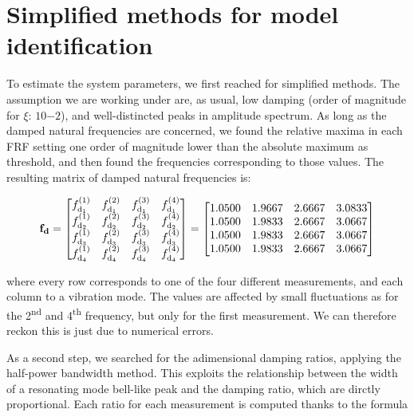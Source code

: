\documentclass[a4paper,12pt,oneside]{article}
\begin{document}
\section{Simplified methods for model identification}

To estimate the system parameters, we first reached for simplified methods. The assumption we are working under are, as usual, low damping (order of magnitude for $ \xi $: $ 10{-2} $), and well-distincted peaks in amplitude spectrum. As long as the damped natural frequencies are concerned, we found the relative maxima in each FRF setting one order of magnitude lower than the absolute maximum as threshold, and then found the frequencies corresponding to those values. The resulting matrix of damped natural frequencies is:

\[
	\mathbf{f_d} =	\begin{bmatrix}
										f_{\textup{d}_1}^{(1)}	& f_{\textup{d}_1}^{(2)} & %
											f_{\textup{d}_1}^{(3)}	& f_{\textup{d}_1}^{(4)} \\
										f_{\textup{d}_2}^{(1)}	& f_{\textup{d}_2}^{(2)} & %
											f_{\textup{d}_2}^{(3)}	& f_{\textup{d}_2}^{(4)} \\
										f_{\textup{d}_3}^{(1)}	& f_{\textup{d}_3}^{(2)} & %
											f_{\textup{d}_3}^{(3)}	& f_{\textup{d}_3}^{(4)} \\
										f_{\textup{d}_4}^{(1)}	& f_{\textup{d}_4}^{(2)} & %
											f_{\textup{d}_4}^{(3)}	& f_{\textup{d}_4}^{(4)} \\
									\end{bmatrix} = \begin{bmatrix}
																		1.0500	& 1.9667	& 2.6667	& 3.0833 \\
																		1.0500	& 1.9833	& 2.6667	& 3.0667 \\
																		1.0500	& 1.9833	& 2.6667	& 3.0667 \\
																		1.0500	& 1.9833	& 2.6667	& 3.0667
																	\end{bmatrix}
\]

where every row corresponds to one of the four different measurements, and each column to a vibration mode. The values are affected by small fluctuations as for the 2\textsuperscript{nd} and 4\textsuperscript{th} frequency, but only for the first measurement. We can therefore reckon this is just due to numerical errors.

As a second step, we searched for the adimensional damping ratios, applying the half-power bandwidth method. This exploits the relationship between the width of a resonating mode bell-like peak and the damping ratio, which are dirctly proportional. Each ratio for each measurement is computed thanks to the formula
\end{document}
